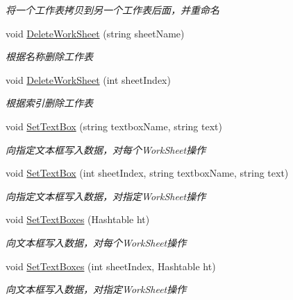 \begin{DoxyCompactItemize}
\begin{DoxyCompactList}\small\item\em 将一个工作表拷贝到另一个工作表后面，并重命名 \end{DoxyCompactList}\item 
void \hyperlink{class_x_c_l_net_tools_1_1_data_handler_1_1_excel_helper_ab6b232c0411cec6a15affbe3664a8cd0}{Delete\-Work\-Sheet} (string sheet\-Name)
\begin{DoxyCompactList}\small\item\em 根据名称删除工作表 \end{DoxyCompactList}\item 
void \hyperlink{class_x_c_l_net_tools_1_1_data_handler_1_1_excel_helper_a21db1bb567b78dce9d069f33b22f4b25}{Delete\-Work\-Sheet} (int sheet\-Index)
\begin{DoxyCompactList}\small\item\em 根据索引删除工作表 \end{DoxyCompactList}\item 
void \hyperlink{class_x_c_l_net_tools_1_1_data_handler_1_1_excel_helper_ab8f108b5bd5c60144bc5666884c5191b}{Set\-Text\-Box} (string textbox\-Name, string text)
\begin{DoxyCompactList}\small\item\em 向指定文本框写入数据，对每个\-Work\-Sheet操作 \end{DoxyCompactList}\item 
void \hyperlink{class_x_c_l_net_tools_1_1_data_handler_1_1_excel_helper_a86d566cea97a41b04cad4c896051b6d9}{Set\-Text\-Box} (int sheet\-Index, string textbox\-Name, string text)
\begin{DoxyCompactList}\small\item\em 向指定文本框写入数据，对指定\-Work\-Sheet操作 \end{DoxyCompactList}\item 
void \hyperlink{class_x_c_l_net_tools_1_1_data_handler_1_1_excel_helper_ab9019cd73148e6176ed400ba305d15e5}{Set\-Text\-Boxes} (Hashtable ht)
\begin{DoxyCompactList}\small\item\em 向文本框写入数据，对每个\-Work\-Sheet操作 \end{DoxyCompactList}\item 
void \hyperlink{class_x_c_l_net_tools_1_1_data_handler_1_1_excel_helper_a2b06a36aeacbea3f7158bb45db1f59a2}{Set\-Text\-Boxes} (int sheet\-Index, Hashtable ht)
\begin{DoxyCompactList}\small\item\em 向文本框写入数据，对指定\-Work\-Sheet操作 \end{DoxyCompactList}\item 

\end{DoxyCompactItemize}

